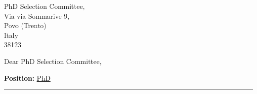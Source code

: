 \documentclass[11pt, a4paper, roman]{letter}
\begin{document}
\begin{minipage}[t]{\textwidth}

    \begin{letter} {PhD Selection Committee,\\
Via via Sommarive 9,  \\Povo (Trento)\\Italy\\38123} %
\setlength{\parskip}{5pt} %
\setlength{\baselineskip}{15pt} %
    \opening{Dear PhD Selection Committee,}

    \begin{center} {\textbf{Position:} \underline{PhD}} \end{center}

\justifying{
}

\vspace*{\fill}
{\color{cvteal} \rule{\linewidth}{1mm}}

\newpage

\newpage

{
\setlength{\parskip}{10pt}
\setlength{\parindent}{10pt}
\setlength{\baselineskip}{15pt}

}
\end{letter}
\end{minipage}
\end{document}
